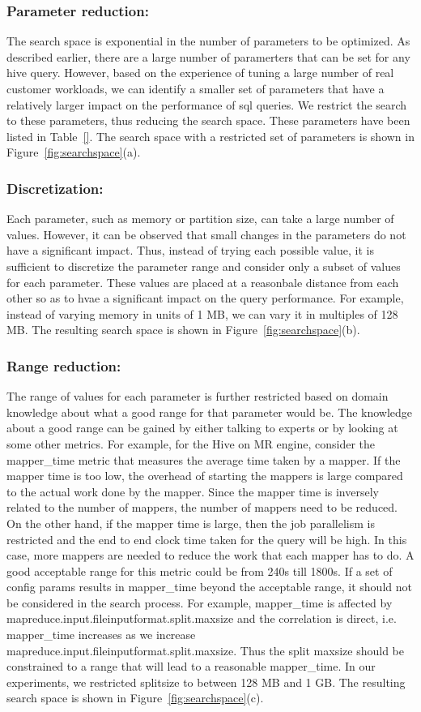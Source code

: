 \noindent\subsubsection*{\bf Parameter reduction: }
\label{sec:paramreduction}
The search space is exponential in the number of parameters to be optimized. As described earlier, there are a large number of paramerters that can be set for any hive query. However, based on the experience of tuning a large number of real customer workloads, we can identify a smaller set of parameters that have a relatively larger impact on the performance of sql queries. We restrict the search to these parameters, thus reducing the search space. These parameters have been listed in Table~\ref{}. The search space with a restricted set of parameters is shown in Figure~\ref{fig:searchspace}(a).
\noindent\subsubsection*{\bf Discretization: }
Each parameter, such as memory or partition size, can take a large number of values. However, it can be observed that small changes in the parameters do not have a significant impact. Thus, instead of trying each possible value, it is sufficient to discretize the parameter range and consider only a subset of values for each parameter. These values are placed at a reasonbale distance from each other so as to hvae a significant impact on the query performance. For example, instead of varying memory in units of 1 MB, we can vary it in multiples of 128 MB. The resulting search space is shown in Figure~\ref{fig:searchspace}(b).
\noindent\subsubsection*{\bf Range reduction: }
The range of values for each parameter is further restricted based on domain knowledge about what a good range for that parameter would be.  The knowledge about a good range can be gained by either talking to experts or by looking at some other metrics. For example, for the Hive on MR engine, consider the mapper\_time metric that measures the average time taken by a mapper. If the mapper time is too low, the overhead of starting the mappers is large compared to the actual work done by the mapper. Since the mapper time is inversely related to the number of mappers, the number of mappers need to be reduced. On the other hand, if the mapper time is large, then the job parallelism is restricted and the end to end clock time taken for the query will be high. In this case, more mappers are needed to reduce the work that each mapper has to do. A good acceptable range for this metric could be from 240s till 1800s.  If a set of config params results in mapper\_time beyond the acceptable range, it should not be considered in the search process. For example, mapper\_time is affected by mapreduce.input.fileinputformat.split.maxsize and the correlation is direct, i.e. mapper\_time  increases as we increase mapreduce.input.fileinputformat.split.maxsize.  Thus the split maxsize should be constrained to a range that will lead to a reasonable mapper\_time. In our experiments, we restricted splitsize to between 128 MB and 1 GB. The resulting search space is shown in Figure~\ref{fig:searchspace}(c).
